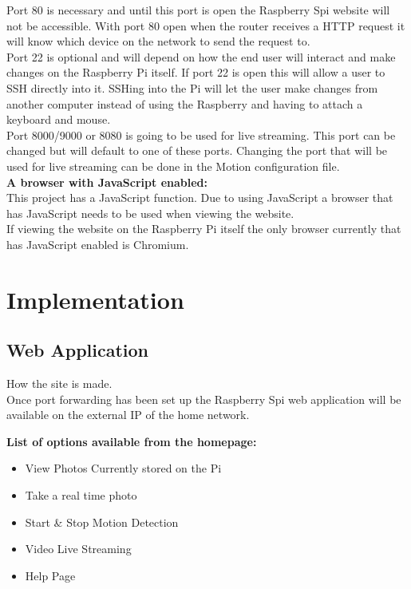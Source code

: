 \documentclass[]{report}
\begin{document}
Port 80 is necessary and until this port is open the Raspberry Spi website will not be accessible. With port 80 open when the router receives a HTTP request it will know which device on the network to send the request to.\\

Port 22 is optional and will depend on how the end user will interact and make changes on the Raspberry Pi itself. If port 22 is open this will allow a user to SSH directly into it. SSHing into the Pi will let the user make changes from another computer instead of using the Raspberry and having to attach a keyboard and mouse.\\

Port 8000/9000 or 8080 is going to be used for live streaming. This port can be changed but will default to one of these ports. Changing the port that will be used for live streaming can be done in the Motion configuration file.\\

\noindent
{\bf A browser with JavaScript enabled:}\\
\break
This project has a JavaScript function. Due to using JavaScript a browser that has JavaScript needs to be used when viewing the website.\\

If viewing the website on the Raspberry Pi itself the only browser currently that has JavaScript enabled is Chromium.\\
%
%
\chapter {Implementation}
\label {ch:implem}
\section {Web Application}
\label {sec:webapp}
How the site is made.\\
Once port forwarding has been set up the Raspberry Spi web application will be available on the external IP of the home network.

{\bf List of options available from the homepage:}
\begin {itemize}
  \item View Photos Currently stored on the Pi\\
  \item Take a real time photo\\
  \item Start \& Stop Motion Detection\\
  \item Video Live Streaming\\
  \item Help Page\\
\end {itemize}
\end{document}
